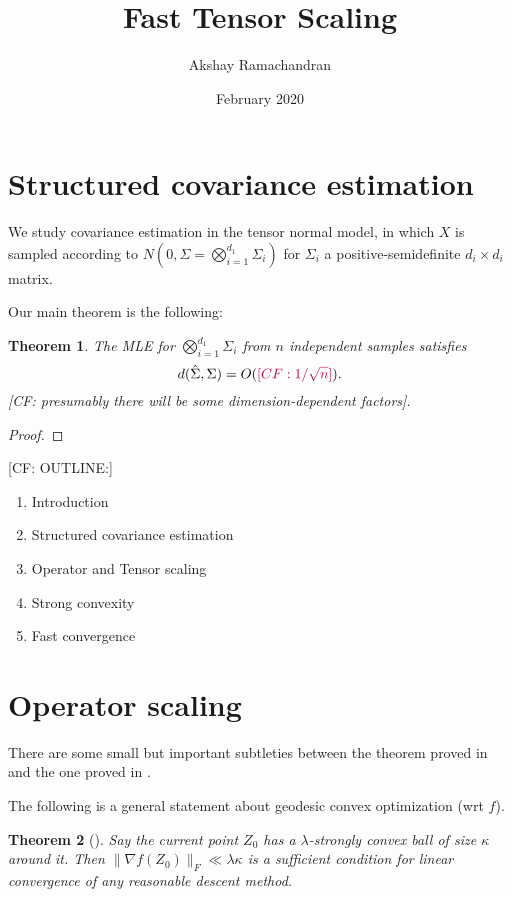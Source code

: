 \documentclass{article}
\title{Fast Tensor Scaling}
\author{Akshay Ramachandran }
\date{February 2020}
\newtheorem{theorem}{Theorem}
\newcommand{\CF}[1]{{\color{purple}[CF: #1]}}
\begin{document}
\maketitle


\section{Structured covariance estimation}
We study covariance estimation in the tensor normal model, in which $X$ is sampled according to $N(0, \Sigma = \bigotimes_{i = 1}^{d_1} \Sigma_i)$ for $\Sigma_i$ a positive-semidefinite $d_i\times d_i$ matrix.

Our main theorem is the following:

\begin{theorem} The MLE for $\bigotimes_{i = 1}^{d_1} \Sigma_i$ from $n$ independent samples satisfies 
$$ d(\hat{\Sigma}, \Sigma) = O(\CF{1/\sqrt{n}}). $$
\CF{presumably there will be some dimension-dependent factors}.
\end{theorem}

\begin{proof}

\end{proof}
\CF{OUTLINE:}
\begin{enumerate}
\item Introduction 
\item Structured covariance estimation
\item Operator and Tensor scaling
\item Strong convexity
\item Fast convergence
\end{enumerate}






\section{Operator scaling}

There are some small but important subtleties between the theorem proved in \cite{FM20} and the one proved in \cite{KLR19}. 

The following is a general statement about geodesic convex optimization (wrt $f$).
\begin{theorem}[\cite{FM20}]
Say the current point $Z_{0}$ has a $\lambda$-strongly convex ball of size $\kappa$ around it. Then $\|\nabla f(Z_{0})\|_{F} \ll \lambda \kappa$ is a sufficient condition for linear convergence of any reasonable descent method. 
\end{theorem}
\end{document}
